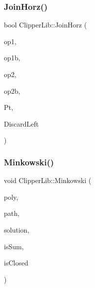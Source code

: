\mbox{\label{namespace_clipper_lib_acd026a4d43018ae65b8d253fbf44b680}} 
\subsubsection{\texorpdfstring{JoinHorz()}{JoinHorz()}}
{\footnotesize\ttfamily bool Clipper\+Lib\+::\+Join\+Horz (\begin{DoxyParamCaption}\item[{\mbox{\hyperlink{struct_clipper_lib_1_1_out_pt}{Out\+Pt}} $\ast$}]{op1,  }\item[{\mbox{\hyperlink{struct_clipper_lib_1_1_out_pt}{Out\+Pt}} $\ast$}]{op1b,  }\item[{\mbox{\hyperlink{struct_clipper_lib_1_1_out_pt}{Out\+Pt}} $\ast$}]{op2,  }\item[{\mbox{\hyperlink{struct_clipper_lib_1_1_out_pt}{Out\+Pt}} $\ast$}]{op2b,  }\item[{const \mbox{\hyperlink{struct_clipper_lib_1_1_int_point}{Int\+Point}}}]{Pt,  }\item[{bool}]{Discard\+Left }\end{DoxyParamCaption})}

\mbox{\label{namespace_clipper_lib_a63c9e744bc436b681c98c2f238e22455}} 
\subsubsection{\texorpdfstring{Minkowski()}{Minkowski()}}
{\footnotesize\ttfamily void Clipper\+Lib\+::\+Minkowski (\begin{DoxyParamCaption}\item[{const \mbox{\hyperlink{namespace_clipper_lib_af39c8fe00f278f18cc8142fef41242da}{Path}} \&}]{poly,  }\item[{const \mbox{\hyperlink{namespace_clipper_lib_af39c8fe00f278f18cc8142fef41242da}{Path}} \&}]{path,  }\item[{\mbox{\hyperlink{namespace_clipper_lib_a4bab1d9e10805fa6f1fd3b78c56efcfe}{Paths}} \&}]{solution,  }\item[{bool}]{is\+Sum,  }\item[{bool}]{is\+Closed }\end{DoxyParamCaption})}

